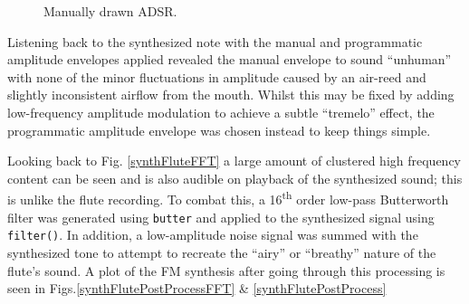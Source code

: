 \documentclass{article}
\begin{document}
\begin{figure}[H]
\begin{minipage}{.49\textwidth}
                    \centering
                    \caption{Manually drawn ADSR.}
                    \label{ADSR}
            \end{minipage}
            \end{figure}
            Listening back to the synthesized note with the manual and programmatic amplitude envelopes applied revealed the manual envelope to sound ``unhuman'' with none of the minor fluctuations in amplitude caused by an air-reed and slightly inconsistent airflow from the mouth.
            Whilst this may be fixed by adding low-frequency amplitude modulation to achieve a subtle ``tremelo'' effect, the programmatic amplitude envelope was chosen instead to keep things simple.
            
            Looking back to Fig. \ref{synthFluteFFT} a large amount of clustered high frequency content can be seen and is also audible on playback of the synthesized sound; this is unlike the flute recording.
            To combat this, a 16\textsuperscript{th} order low-pass Butterworth filter was generated using \texttt{butter} and applied to the synthesized signal using \texttt{filter()}.
            In addition, a low-amplitude noise signal was summed with the synthesized tone to attempt to recreate the ``airy'' or ``breathy'' nature of the flute's sound.
            A plot of the FM synthesis after going through this processing is seen in Figs.\ref{synthFlutePostProcessFFT} \& \ref{synthFlutePostProcess}
\end{document}
